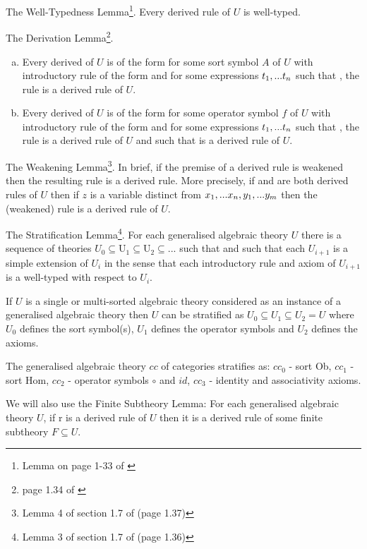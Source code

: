 \note The Well-Typedness Lemma\footnote{Lemma on page 1-33 of \cite{Cartmell78}}. Every derived rule of $U$ is well-typed. 

\note The Derivation Lemma\footnote{page 1.34 of \cite{Cartmell78}}. 
\begin{enumerate}[(a)]

\item Every derived \Trule of $U$ is of the form
 for some sort symbol $A$ of $U$ with introductory rule of the form
 and for some expressions $t_1,...t_n$ such that \foreachi, the rule
 is a derived rule of $U$.

\item Every derived \trule of $U$ is of the form
 for some operator symbol $f$ of $U$ 
with introductory rule of the form
and for some expressions $t_1,...t_n$ such that \foreachi, the rule
 is a derived rule of $U$
and such that
 is a derived rule of $U$.
\end{enumerate}

\note The Weakening Lemma\footnote{Lemma 4 of section 1.7 of \cite{Cartmell78} (page 1.37)}. In brief, if the premise of a derived rule is weakened then the resulting rule is a derived rule. More precisely, if 
  and
 are both derived rules of $U$ then if $z$ is a variable
distinct from $x_1,...x_n,y_1,...y_m$ then
the (weakened) rule  is a derived rule
of $U$.

\note The Stratification Lemma\footnote{Lemma 3 of section 1.7 of \cite{Cartmell78} (page 1.36)}. For each generalised algebraic theory $U$  there is a sequence of theories 
$U_0 \subseteq $U$_1 \subseteq $U$_2 \subseteq ...$ such that  
and such that each $U_{i+1}$ is a simple extension of $U_i$ in the sense that each introductory rule and axiom of $U_{i+1}$ is a well-typed  with respect to $U_i$.

\note
If $U$ is a single or multi-sorted algebraic theory considered as an instance of a
 generalised algebraic theory then $U$ can be stratified as $U_0 \subseteq U_1 \subseteq U_2=U$
where $U_0$ defines the sort symbol(s), $U_1$ defines the operator symbols and $U_2$ defines the axioms. 

\note The generalised algebraic theory $cc$ of categories stratifies as: $cc_0$ - sort Ob,
$cc_1$ - sort Hom, $cc_2$ - operator symbols $\circ$ and $id$, $cc_3$ - identity and associativity axioms.
 

\note We will also use the Finite Subtheory Lemma: For each generalised algebraic theory $U$, if r is a derived rule of $U$ then it is a derived rule of some finite subtheory $F \subseteq U$. \




